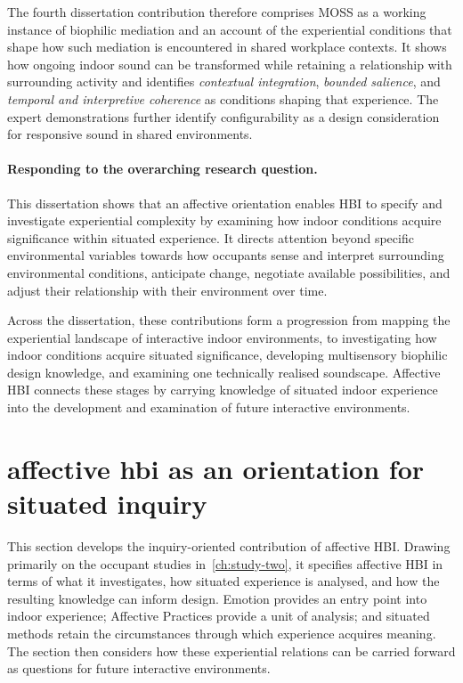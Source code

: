 The fourth dissertation contribution therefore comprises MOSS as a working instance of biophilic mediation and an account of the experiential conditions that shape how such mediation is encountered in shared workplace contexts. It shows how ongoing indoor sound can be transformed while retaining a relationship with surrounding activity and identifies \emph{contextual integration}, \emph{bounded salience}, and \emph{temporal and interpretive coherence} as conditions shaping that experience. The expert demonstrations further identify configurability as a design consideration for responsive sound in shared environments.

\paragraph{Responding to the overarching research question.}

This dissertation shows that an affective orientation enables HBI to
specify and investigate experiential complexity by examining how indoor
conditions acquire significance within situated experience. It directs
attention beyond specific environmental variables towards how
occupants sense and interpret surrounding environmental conditions, anticipate change, negotiate available possibilities, and adjust their relationship with their environment over time.

Across the dissertation, these contributions form a progression from
mapping the experiential landscape of interactive indoor environments,
to investigating how indoor conditions acquire situated significance,
developing multisensory biophilic design knowledge, and examining one
technically realised soundscape. Affective HBI connects these stages by
carrying knowledge of situated indoor experience into the development
and examination of future interactive environments.



\section{affective hbi as an orientation for situated inquiry}
\label{sec:affect-contribution}

This section develops the inquiry-oriented contribution of affective HBI. Drawing primarily on the occupant studies in~\autoref{ch:study-two}, it specifies affective HBI in terms of what it investigates, how situated experience is analysed, and how the resulting knowledge can inform design. Emotion provides an entry point into indoor experience; Affective Practices provide a unit of analysis; and situated methods retain the circumstances through which experience acquires meaning. The section then considers how these experiential relations can be carried forward as questions for future interactive environments.

